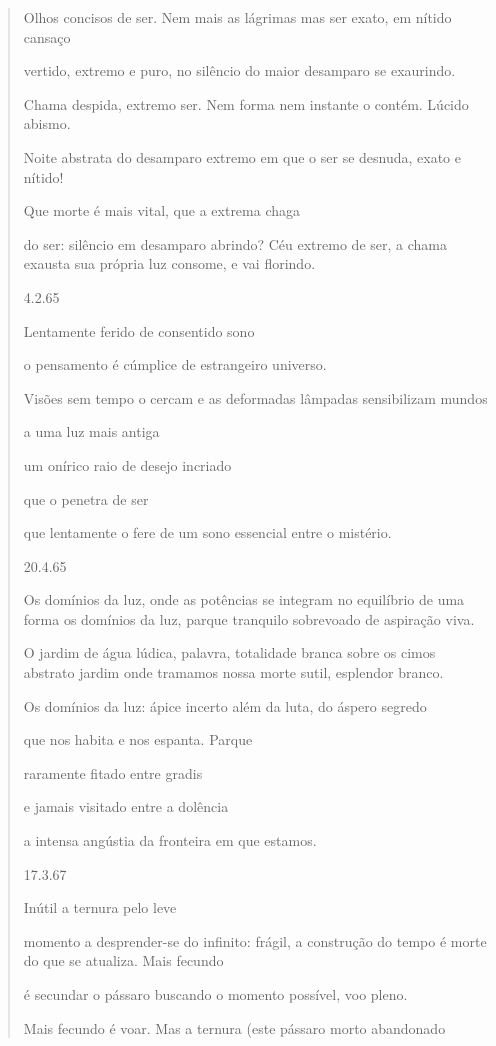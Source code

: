 \begin{quote}
Olhos concisos de ser. Nem mais as lágrimas mas ser exato, em nítido
cansaço

vertido, extremo e puro, no silêncio do maior desamparo se exaurindo.

Chama despida, extremo ser. Nem forma nem instante o contém. Lúcido
abismo.

Noite abstrata do desamparo extremo em que o ser se desnuda, exato e
nítido!

Que morte é mais vital, que a extrema chaga

do ser: silêncio em desamparo abrindo? Céu extremo de ser, a chama
exausta sua própria luz consome, e vai florindo.

4.2.65

Lentamente ferido de consentido sono

o pensamento é cúmplice de estrangeiro universo.

Visões sem tempo o cercam e as deformadas lâmpadas sensibilizam mundos

a uma luz mais antiga

um onírico raio de desejo incriado

que o penetra de ser

que lentamente o fere de um sono essencial entre o mistério.

20.4.65

Os domínios da luz, onde as potências se integram no equilíbrio de uma
forma os domínios da luz, parque tranquilo sobrevoado de aspiração viva.

O jardim de água lúdica, palavra, totalidade branca sobre os cimos
abstrato jardim onde tramamos nossa morte sutil, esplendor branco.

Os domínios da luz: ápice incerto além da luta, do áspero segredo

que nos habita e nos espanta. Parque

raramente fitado entre gradis

e jamais visitado entre a dolência

a intensa angústia da fronteira em que estamos.

17.3.67

Inútil a ternura pelo leve

momento a desprender-se do infinito: frágil, a construção do tempo é
morte do que se atualiza. Mais fecundo

é secundar o pássaro buscando o momento possível, voo pleno.

Mais fecundo é voar. Mas a ternura (este pássaro morto abandonado


\end{quote}
